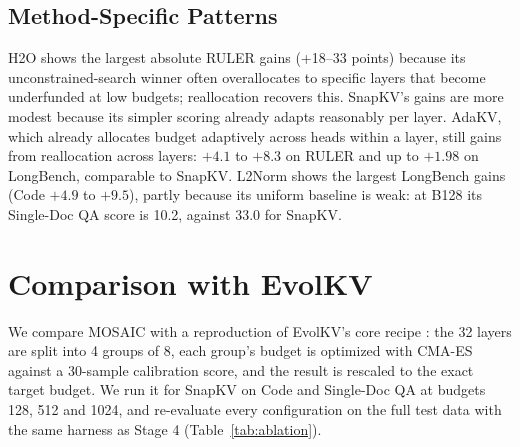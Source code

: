 \documentclass[11pt]{article}
\begin{document}
\subsection{Method-Specific Patterns}

H2O shows the largest absolute RULER gains (+18–33 points) because its unconstrained-search winner often overallocates to specific layers that become underfunded at low budgets; reallocation recovers this. SnapKV's gains are more modest because its simpler scoring already adapts reasonably per layer. AdaKV, which already allocates budget adaptively across heads within a layer, still gains from reallocation across layers: $+4.1$ to $+8.3$ on RULER and up to $+1.98$ on LongBench, comparable to SnapKV. L2Norm shows the largest LongBench gains (Code $+4.9$ to $+9.5$), partly because its uniform baseline is weak: at B128 its Single-Doc QA score is 10.2, against 33.0 for SnapKV.

\section{Comparison with EvolKV}

We compare MOSAIC with a reproduction of EvolKV's core recipe \citep{yu2025evolkv}: the 32 layers are split into 4 groups of 8, each group's budget is optimized with CMA-ES against a 30-sample calibration score, and the result is rescaled to the exact target budget. We run it for SnapKV on Code and Single-Doc QA at budgets 128, 512 and 1024, and re-evaluate every configuration on the full test data with the same harness as Stage 4 (Table~\ref{tab:ablation}).
\end{document}
